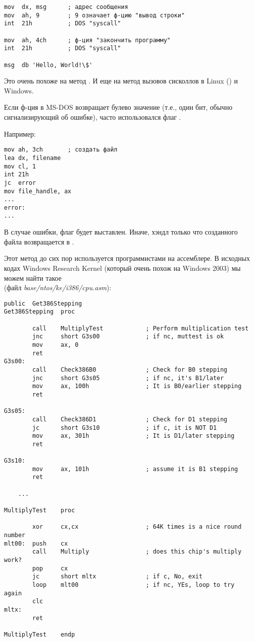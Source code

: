 \begin{lstlisting}[style=customasmx86]
mov  dx, msg      ; адрес сообщения
mov  ah, 9        ; 9 означает ф-цию "вывод строки"
int  21h          ; DOS "syscall"

mov  ah, 4ch      ; ф-ция "закончить программу"
int  21h          ; DOS "syscall"

msg  db 'Hello, World!\$'
\end{lstlisting}

Это очень похоже на метод .
И еще на метод вызовов сисколлов в Linux () и Windows.

Если ф-ция в MS-DOS возвращает булево значение (т.е., один бит, обычно сигнализирующий об ошибке),
часто использовался флаг .

Например:

\begin{lstlisting}[style=customasmx86]
mov ah, 3ch       ; создать файл
lea dx, filename
mov cl, 1
int 21h
jc  error
mov file_handle, ax
...
error:
...
\end{lstlisting}

В случае ошибки, флаг  будет выставлен.
Иначе, хэндл только что созданного файла возвращается в .

Этот метод до сих пор используется программистами на ассемблере.
В исходных кодах Windows Research Kernel (который очень похож на Windows 2003) мы можем найти такое\\
(файл \emph{base/ntos/ke/i386/cpu.asm}):

\begin{lstlisting}[style=customasmx86]
        public  Get386Stepping
Get386Stepping  proc

        call    MultiplyTest            ; Perform multiplication test
        jnc     short G3s00             ; if nc, muttest is ok
        mov     ax, 0
        ret
G3s00:
        call    Check386B0              ; Check for B0 stepping
        jnc     short G3s05             ; if nc, it's B1/later
        mov     ax, 100h                ; It is B0/earlier stepping
        ret

G3s05:
        call    Check386D1              ; Check for D1 stepping
        jc      short G3s10             ; if c, it is NOT D1
        mov     ax, 301h                ; It is D1/later stepping
        ret

G3s10:
        mov     ax, 101h                ; assume it is B1 stepping
        ret

	...

MultiplyTest    proc

        xor     cx,cx                   ; 64K times is a nice round number
mlt00:  push    cx
        call    Multiply                ; does this chip's multiply work?
        pop     cx
        jc      short mltx              ; if c, No, exit
        loop    mlt00                   ; if nc, YEs, loop to try again
        clc
mltx:
        ret

MultiplyTest    endp
\end{lstlisting}


